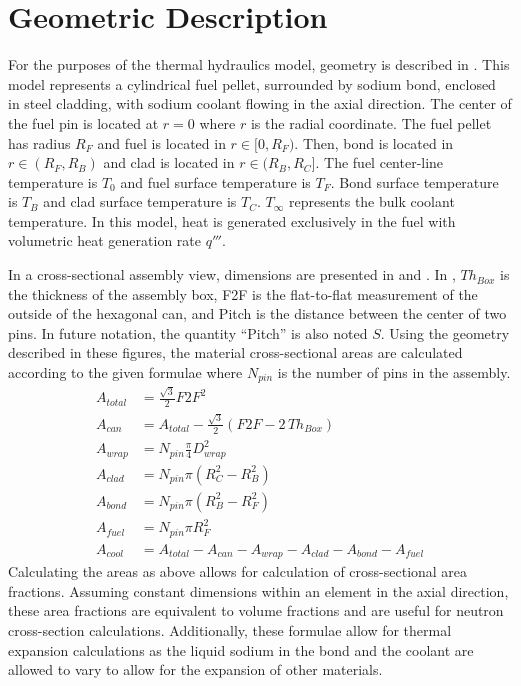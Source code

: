 \section{Geometric Description}
  For the purposes of the thermal hydraulics model, geometry is described in
  . This model represents a cylindrical fuel pellet,
  surrounded by sodium bond, enclosed in steel cladding, with sodium coolant
  flowing in the axial direction. The center of the fuel pin is located at
  $r=0$ where $r$ is the radial coordinate. The fuel pellet has radius $R_F$ and
  fuel is located in $r \in [0,R_F)$. Then, bond is located in $r \in (R_F,R_B)$
  and clad is located in $r \in (R_B,R_C]$. The fuel center-line temperature is
  $T_0$ and fuel surface temperature is $T_F$. Bond surface temperature is
  $T_B$ and clad surface temperature is $T_C$. $T_{\infty}$ represents the bulk
  coolant temperature. In this model, heat is generated exclusively in the fuel
  with volumetric heat generation rate $q'''$. 

  In a cross-sectional assembly view, dimensions are presented in
   and . In , $Th_{Box}$
  is the thickness of the assembly box, F2F is the flat-to-flat measurement of
  the outside of the hexagonal can, and Pitch is the distance between the
  center of two pins. In future notation, the quantity ``Pitch'' is also noted
  $S$. Using the geometry described in these figures, the material
  cross-sectional areas are calculated according to the given formulae where
  $N_{pin}$ is the number of pins in the assembly.
  \begin{align}
    \label{eq:afrac_first}
    A_{total} &= \frac{\sqrt{3}}{2} F2F^2 \\
    A_{can} &= A_{total} - 
      \frac{\sqrt{3}}{2} \left(  F2F - 2 \, Th_{Box} \right) \\
    A_{wrap} &= N_{pin} \frac{\pi}{4} D_{wrap}^2 \\
    A_{clad} &= N_{pin} \pi (R_C^2 - R_B^2) \\
    A_{bond} &= N_{pin} \pi (R_B^2 - R_F^2) \\
    A_{fuel} &= N_{pin} \pi R_F^2 \\
    \label{eq:afrac_last}
    A_{cool} &= A_{total} - A_{can} - A_{wrap} - A_{clad} - A_{bond} - A_{fuel}
  \end{align}
  Calculating the areas as above allows for calculation of cross-sectional area
  fractions. Assuming constant dimensions within an element in the axial
  direction, these area fractions are equivalent to volume fractions and are
  useful for neutron cross-section calculations. Additionally, these formulae
  allow for thermal expansion calculations as the liquid sodium in the bond and
  the coolant are allowed to vary to allow for the expansion of other materials.


